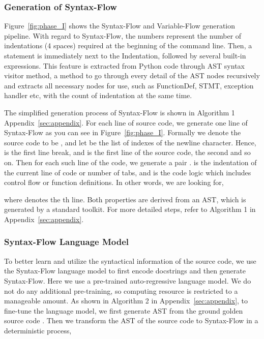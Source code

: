 \documentclass[11pt]{article}
\begin{document}
\subsubsection{Generation of Syntax-Flow}
Figure~\ref{fig:phase_I} shows the Syntax-Flow and Variable-Flow generation pipeline. With regard to Syntax-Flow, the numbers represent the number of indentations (4 spaces) required at the beginning of the command line. Then, a statement is immediately next to the Indentation, followed by several built-in expressions.
This feature is extracted from Python code through AST syntax visitor method, a method to go through every detail of the AST nodes recursively and extracts all necessary nodes for use, such as FunctionDef, STMT, exception handler etc, with the count of indentation at the same time. 



The simplified generation process of Syntax-Flow is shown in Algorithm 1 Appendix~\ref{sec:appendix}. For each line of source code, we generate one line of Syntax-Flow as you can see in Figure~\ref{fig:phase_I}. Formally we denote the source code to be , and let  be the list of indexes of the newline character. Hence,  is the first line break, and  is the first line of the source code,  the second and so on. Then for each such line of the code, we generate a pair .  is the indentation of the current line of code or number of tabs, and  is the code logic which includes control flow or function definitions. In other words, we are looking for, 


where  denotes the th line. Both properties are derived from an AST, which is generated by a standard toolkit. For more detailed steps, refer to Algorithm 1 in Appendix~\ref{sec:appendix}.


\subsubsection{Syntax-Flow Language Model}
To better learn and utilize the syntactical information of the source code, we use the Syntax-Flow language model to first encode docstrings and then generate Syntax-Flow. Here we use a pre-trained auto-regressive language model. We do not do any additional pre-training, so computing resource is restricted to a manageable amount. As shown in Algorithm 2 in Appendix~\ref{sec:appendix}, to fine-tune the language model, we first generate AST from the ground golden source code . Then we transform the AST of the source code to Syntax-Flow in a deterministic process,
\end{document}
